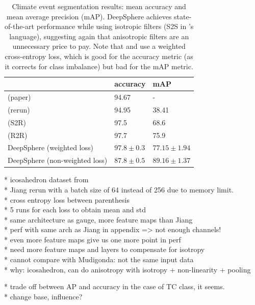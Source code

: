 \documentclass{article} %
\begin{document}
\begin{table}
	\centering
	\begin{tabular}{l l l}
	\toprule
	& accuracy & mAP \\
	\midrule
	\cite{jiang2019sphericalcnn} (paper) & 94.67 & - \\
	\cite{jiang2019sphericalcnn} (rerun) & 94.95 & 38.41 \\
	\cite{cohen2019gauge} (S2R) & 97.5 & 68.6 \\
	\cite{cohen2019gauge} (R2R) & 97.7 & 75.9 \\
	DeepSphere (weighted loss) & $97.8\pm 0.3$ & $77.15\pm 1.94$ \\
	DeepSphere (non-weighted loss) & $87.8\pm 0.5$ & $89.16\pm 1.37$ \\
	\bottomrule
	\end{tabular}
	\caption{
		Climate event segmentation results: mean accuracy and mean average precision (mAP). DeepSphere achieves state-of-the-art performance while using isotropic filters (S2S in \citet{cohen2019gauge}'s language), suggesting again that anisotropic filters are an unnecessary price to pay.
		Note that \citet{jiang2019sphericalcnn} and \citet{cohen2019gauge} use a weighted cross-entropy loss, which is good for the accuracy metric (as it corrects for class imbalance) but bad for the mAP metric.
	}
\end{table}

* icosahedron dataset from \cite{jiang2019sphericalcnn} \\
* Jiang rerun with a batch size of 64 instead of 256 due to memory limit.\\
* cross entropy loss between parenthesis\\
* 5 runs for each loss to obtain mean and std\\
* same architecture as gauge, more feature maps than Jiang\\
* perf with same arch as Jiang in appendix => not enough channels!\\
* even more feature maps give us one more point in perf\\
* need more feature maps and layers to compensate for isotropy \\
* cannot compare with Mudigonda: not the same input data\\
* why: icosahedron, can do anisotropy with isotropy + non-linearity + pooling

* trade off between AP and accuracy in the case of TC class, it seems.\\
* change base, influence?\\
\end{document}
